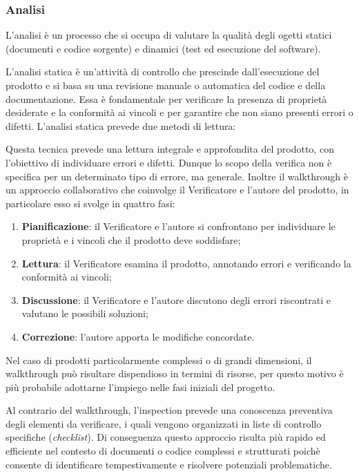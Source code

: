 \subsubsection{Analisi}
L'analisi è un processo che si occupa di valutare la qualità degli ogetti statici (documenti e codice sorgente) e dinamici
(test ed esecuzione del software).

L'analisi statica è un'attività di controllo che prescinde dall'esecuzione del prodotto e si basa su una revisione manuale o automatica
del codice e della documentazione. Essa è fondamentale per verificare la presenza di proprietà desiderate e la conformità ai vincoli e
per garantire che non siano presenti errori o difetti. L'analisi statica prevede due metodi di lettura:

Questa tecnica prevede una lettura integrale e approfondita del prodotto, con l'obiettivo di individuare errori e difetti. Dunque lo scopo della verifica
non è specifica per un determinato tipo di errore, ma generale. Inoltre il walkthrough è un approccio collaborativo che coinvolge il Verificatore
e l'autore del prodotto, in particolare esso si svolge in quattro fasi:
\begin{enumerate}
	\item \textbf{Pianificazione}: il Verificatore e l'autore si confrontano per individuare le proprietà e i vincoli che il prodotto deve soddisfare;
	\item \textbf{Lettura}: il Verificatore esamina il prodotto, annotando errori e verificando la conformità ai vincoli;
	\item \textbf{Discussione}: il Verificatore e l'autore discutono degli errori riscontrati e valutano le possibili soluzioni;
	\item \textbf{Correzione}: l'autore apporta le modifiche concordate.
\end{enumerate}
Nel caso di prodotti particolarmente complessi o di grandi dimensioni, il walkthrough può risultare dispendioso in termini di risorse,
per questo motivo è più probabile adottarne l'impiego nelle fasi iniziali del progetto.

Al contrario del walkthrough, l'inspection prevede una conoscenza preventiva degli elementi da verificare, i quali vengono organizzati in
liste di controllo specifiche (\textit{checklist}). Di conseguenza questo approccio risulta più rapido ed efficiente nel contesto di documenti
o codice complessi e strutturati poichè consente di identificare tempestivamente e risolvere potenziali problematiche.

